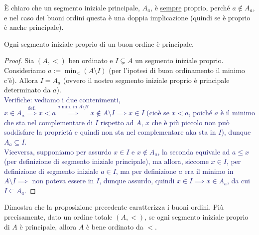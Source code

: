 \documentclass[11pt]{scrartcl}
\begin{document}
È chiaro che un segmento iniziale principale, $A_a$, è \underline{sempre} proprio, perché $a \not \in A_a$, e nel caso dei buoni ordini questa è una doppia implicazione (quindi se è proprio è 
anche principale).

\begin{proposition}
	Ogni segmento iniziale proprio di un buon ordine è principale.
\end{proposition}

\begin{proof}
	Sia $(A,<)$ ben ordinato e $I \subsetneq A$ un segmento iniziale proprio. Consideriamo $a := \min_<(A \setminus I)$ (per l'ipotesi di buon ordinamento il minimo c'è). Allora $I = A_a$ (ovvero 
	il nostro segmento iniziale proprio è principale determinato da $a$).\\
	\textcolor{MidnightBlue}{Verifiche: vediamo i due contenimenti, $x \in A_a \overset{\text{def.}}{\implies} x < a \overset{\text{$a$ min. in $A\setminus B$}}{\implies} x \not \in A \setminus I \implies x \in I$
	(cioè se $x < a$, poiché $a$ è il minimo che sta nel complementare di $I$ rispetto ad $A$, $x$ che è più piccolo non può soddisfare la proprietà e quindi non sta nel complementare aka sta in $I$), dunque $A_a \subseteq I$.\\
	Viceversa, supponiamo per assurdo $x \in I$ e $x \not \in A_a$, la seconda equivale ad $a \leq x$ (per definizione di segmento iniziale 
	principale), ma allora, siccome $x \in I$, per definizione di segmento iniziale $a \in I$, ma per definizione $a$ era il minimo in $A \setminus I \implies$ non poteva essere in $I$, dunque assurdo, quindi $x \in I \implies x \in A_a$, da cui $I \subseteq A_a$.}
\end{proof}

\begin{exercise}
	Dimostra che la proposizione precedente caratterizza i buoni ordini. Più precisamente, dato un ordine totale $(A,<)$, se ogni segmento iniziale proprio di $A$
	è principale, allora $A$ è bene ordinato da $<$.
\end{exercise}
\end{document}
